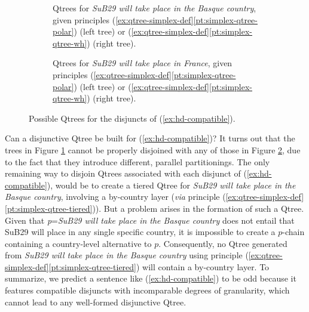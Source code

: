 \begin{figure}[H]
\centering
\begin{subfigure}[b]{.55\linewidth}
	\centering
	\hfill
	\caption{Qtrees for \textit{SuB29 will take place in the Basque country}, given principles (\ref{ex:qtree-simplex-def}\ref{pt:simplex-qtree-polar}) (left tree) or (\ref{ex:qtree-simplex-def}\ref{pt:simplex-qtree-wh}) (right tree).}\label{fig:qtrees-basque}
\end{subfigure}\hfill
\begin{subfigure}[b]{.4\linewidth}
	\centering
	\hfill
	\caption{Qtrees for \textit{SuB29 will take place in France}, given principles (\ref{ex:qtree-simplex-def}\ref{pt:simplex-qtree-polar}) (left tree) or (\ref{ex:qtree-simplex-def}\ref{pt:simplex-qtree-wh}) (right tree).}\label{fig:qtrees-france}
\end{subfigure}\hfill
\caption{Possible Qtrees for the disjuncts of (\ref{ex:hd-compatible}).}\label{fig:qtrees-compat}
\end{figure}


Can  a disjunctive Qtree be built for (\ref{ex:hd-compatible})? It turns out that the trees in Figure \ref{fig:qtrees-basque} cannot be properly disjoined with any of those in Figure \ref{fig:qtrees-france}, due to the fact that they introduce different, parallel partitionings. The only remaining way to disjoin Qtrees associated with each disjunct of (\ref{ex:hd-compatible}), would be to create a tiered Qtree for \textit{SuB29 will take place in the Basque country}, involving a by-country layer (\textit{via} principle (\ref{ex:qtree-simplex-def}\ref{pt:simplex-qtree-tiered})). But a problem arises in the formation of such a Qtree. Given that \textit{p}=\textit{SuB29 will take place in the Basque country} does not entail that SuB29 will place in any single specific country, it is impossible to create a $p$-chain containing a country-level alternative to $p$. Consequently, no Qtree generated from \textit{SuB29 will take place in the Basque country} using principle (\ref{ex:qtree-simplex-def}\ref{pt:simplex-qtree-tiered}) will contain a by-country layer. To summarize, we predict a sentence like (\ref{ex:hd-compatible}) to be odd because it features compatible disjuncts with incomparable degrees of granularity, which cannot lead to any well-formed disjunctive Qtree.

